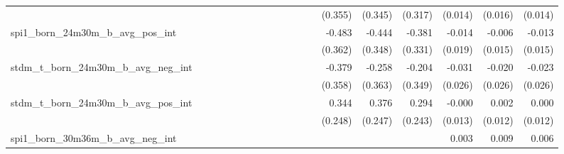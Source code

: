 \begin{tabular}{lrrrrrrrrrrrrrrrrrr}
                                            &              &              &              &              &              &              &              &              &               &              &              &               &      (0.355) &      (0.345) &       (0.317) &      (0.014) &      (0.016) &       (0.014) \\ 
spi1\_born\_24m30m\_b\_avg\_pos\_int        &              &              &              &              &              &              &              &              &               &              &              &               &       -0.483 &       -0.444 &        -0.381 &       -0.014 &       -0.006 &        -0.013 \\ 
                                            &              &              &              &              &              &              &              &              &               &              &              &               &      (0.362) &      (0.348) &       (0.331) &      (0.019) &      (0.015) &       (0.015) \\ 
stdm\_t\_born\_24m30m\_b\_avg\_neg\_int     &              &              &              &              &              &              &              &              &               &              &              &               &       -0.379 &       -0.258 &        -0.204 &       -0.031 &       -0.020 &        -0.023 \\ 
                                            &              &              &              &              &              &              &              &              &               &              &              &               &      (0.358) &      (0.363) &       (0.349) &      (0.026) &      (0.026) &       (0.026) \\ 
stdm\_t\_born\_24m30m\_b\_avg\_pos\_int     &              &              &              &              &              &              &              &              &               &              &              &               &        0.344 &        0.376 &         0.294 &       -0.000 &        0.002 &         0.000 \\ 
                                            &              &              &              &              &              &              &              &              &               &              &              &               &      (0.248) &      (0.247) &       (0.243) &      (0.013) &      (0.012) &       (0.012) \\ 
spi1\_born\_30m36m\_b\_avg\_neg\_int        &              &              &              &              &              &              &              &              &               &              &              &               &              &              &               &        0.003 &        0.009 &         0.006 \\ 

\end{tabular}
